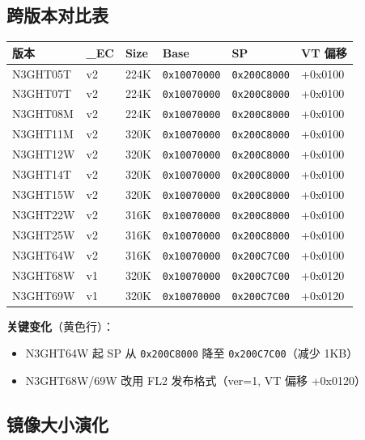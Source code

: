 \documentclass[a4paper,11pt,fontset=none]{ctexart}
\begin{document}
\subsection{跨版本对比表}

\begin{longtable}{l C{1cm} R{1.2cm} R{2.5cm} R{2.5cm} R{1.8cm}}
  \toprule
  \textbf{版本} & \textbf{\_EC} & \textbf{Size} & \textbf{Base} & \textbf{SP} & \textbf{VT 偏移} \\
  \midrule
  \endhead
  N3GHT05T & v2 & 224K & \texttt{0x10070000} & \texttt{0x200C8000} & +0x0100 \\
  N3GHT07T & v2 & 224K & \texttt{0x10070000} & \texttt{0x200C8000} & +0x0100 \\
  N3GHT08M & v2 & 224K & \texttt{0x10070000} & \texttt{0x200C8000} & +0x0100 \\
  N3GHT11M & v2 & 320K & \texttt{0x10070000} & \texttt{0x200C8000} & +0x0100 \\
  N3GHT12W & v2 & 320K & \texttt{0x10070000} & \texttt{0x200C8000} & +0x0100 \\
  N3GHT14T & v2 & 320K & \texttt{0x10070000} & \texttt{0x200C8000} & +0x0100 \\
  N3GHT15W & v2 & 320K & \texttt{0x10070000} & \texttt{0x200C8000} & +0x0100 \\
  N3GHT22W & v2 & 316K & \texttt{0x10070000} & \texttt{0x200C8000} & +0x0100 \\
  N3GHT25W & v2 & 316K & \texttt{0x10070000} & \texttt{0x200C8000} & +0x0100 \\
  N3GHT64W & v2 & 316K & \texttt{0x10070000} & \texttt{0x200C7C00} & +0x0100 \\
  N3GHT68W & v1 & 320K & \texttt{0x10070000} & \texttt{0x200C7C00} & +0x0120 \\
  N3GHT69W & v1 & 320K & \texttt{0x10070000} & \texttt{0x200C7C00} & +0x0120 \\
  \bottomrule
\end{longtable}

\noindent\textbf{关键变化}（黄色行）：
\begin{itemize}[nosep]
  \item N3GHT64W 起 SP 从 \texttt{0x200C8000} 降至 \texttt{0x200C7C00}（减少 1KB）
  \item N3GHT68W/69W 改用 FL2 发布格式（ver=1, VT 偏移 +0x0120）
\end{itemize}

\subsection{镜像大小演化}
\end{document}
